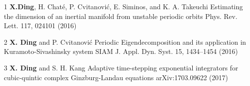 
\begin{cvpub}

  \cvpubentry
  {1}
  {\textbf{X.Ding},  H. Chat\'e, P. Cvitanovi\'c, E. Siminos, and K. A. Takeuchi}
  {Estimating the dimension of an inertial manifold from unstable periodic orbits}
  {Phys. Rev. Lett. 117, 024101 (2016)}

  \cvpubentry
  {2}
  {\textbf{X. Ding} and P. Cvitanovi\'c}
  {Periodic Eigendecomposition and its application in Kuramoto-Sivashinsky system}
  {SIAM J. Appl. Dyn. Syst. 15, 1434–1454 (2016)}

  \cvpubentry
  {3}
  {\textbf{X. Ding} and S. H. Kang}
  {Adaptive time-stepping exponential integrators for cubic-quintic complex Ginzburg-Landau equations}
  {arXiv:1703.09622 (2017)}



\end{cvpub}
